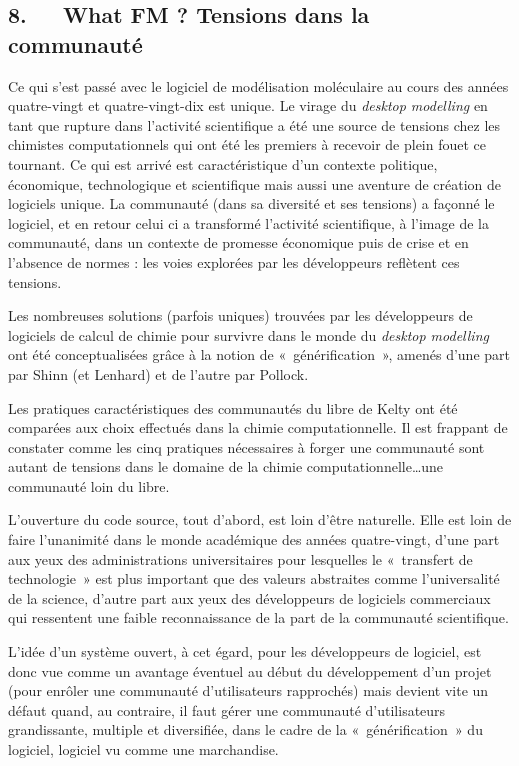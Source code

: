 \documentclass{FramateX}
\begin{document}
\begin{refsection}
\section*{8.~~~What FM ? Tensions dans la communauté}
{}


Ce qui s'est passé avec le logiciel de modélisation
moléculaire au cours des années quatre-vingt et quatre-vingt-dix est
unique. Le virage du \textit{desktop modelling} en tant que rupture
dans l'activité scientifique a été une source de
tensions chez les chimistes computationnels qui ont été les premiers à
recevoir de plein fouet ce tournant. Ce qui est arrivé est
caractéristique d'un contexte politique, économique,
technologique et scientifique mais aussi une aventure de création de
logiciels unique. La communauté (dans sa diversité et ses tensions) a
façonné le logiciel, et en retour celui ci a transformé
l'activité scientifique, à l'image de
la communauté, dans un contexte de promesse économique puis de crise et
en l'absence de normes : les voies explorées par les
développeurs reflètent ces tensions.

Les nombreuses solutions (parfois uniques) trouvées par les
développeurs de logiciels de calcul de chimie pour survivre dans le
monde du \textit{desktop modelling} ont été conceptualisées grâce à
la notion de «~générification~», amenés d'une part par
Shinn (et Lenhard) et de l'autre par Pollock. 

Les pratiques caractéristiques des communautés du libre de Kelty ont été
comparées aux choix effectués dans la chimie computationnelle. Il est
frappant de constater comme les cinq pratiques nécessaires à forger une
communauté sont autant de tensions dans le domaine de la chimie
computationnelle\ldots une communauté loin du libre.

L'ouverture du code source, tout
d'abord, est loin d'être naturelle.
Elle est loin de faire l'unanimité dans le monde
académique des années quatre-vingt, d'une part aux
yeux des administrations universitaires pour lesquelles le «~transfert
de technologie~» est plus important que des valeurs abstraites comme
l'universalité de la science, d'autre
part aux yeux des développeurs de logiciels commerciaux qui ressentent
une faible reconnaissance de la part de la communauté scientifique.

L'idée d'un système ouvert, à cet
égard, pour les développeurs de logiciel, est donc vue comme un
avantage éventuel au début du développement d'un
projet (pour enrôler une communauté d'utilisateurs
rapprochés) mais devient vite un défaut quand, au contraire, il faut
gérer une communauté d'utilisateurs grandissante,
multiple et diversifiée, dans le cadre de la «~générification~» du
logiciel, logiciel vu comme une marchandise.


\end{refsection}
\end{document}
